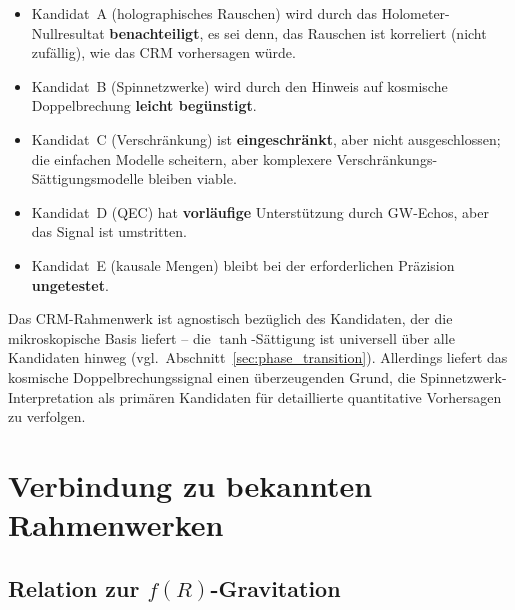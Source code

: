 \documentclass[11pt,a4paper]{article}
\begin{document}
\begin{itemize}
\item Kandidat~A (holographisches Rauschen) wird durch das Holometer-Nullresultat \textbf{benachteiligt}, es sei denn, das Rauschen ist korreliert (nicht zuf\"allig), wie das CRM vorhersagen w\"urde.
\item Kandidat~B (Spinnetzwerke) wird durch den Hinweis auf kosmische Doppelbrechung \textbf{leicht beg\"unstigt}.
\item Kandidat~C (Verschr\"ankung) ist \textbf{eingeschr\"ankt}, aber nicht ausgeschlossen; die einfachen Modelle scheitern, aber komplexere Verschr\"ankungs-S\"attigungsmodelle bleiben viable.
\item Kandidat~D (QEC) hat \textbf{vorl\"aufige} Unterst\"utzung durch GW-Echos, aber das Signal ist umstritten.
\item Kandidat~E (kausale Mengen) bleibt bei der erforderlichen Pr\"azision \textbf{ungetestet}.
\end{itemize}

Das CRM-Rahmenwerk ist agnostisch bez\"uglich des Kandidaten, der die mikroskopische Basis liefert -- die $\tanh$-S\"attigung ist universell \"uber alle Kandidaten hinweg (vgl.\ Abschnitt~\ref{sec:phase_transition}). Allerdings liefert das kosmische Doppelbrechungssignal einen \"uberzeugenden Grund, die Spinnetzwerk-Interpretation als prim\"aren Kandidaten f\"ur detaillierte quantitative Vorhersagen zu verfolgen.


\section{Verbindung zu bekannten Rahmenwerken}
\label{sec:connections}

\subsection{Relation zur $f(R)$-Gravitation}
\end{document}

